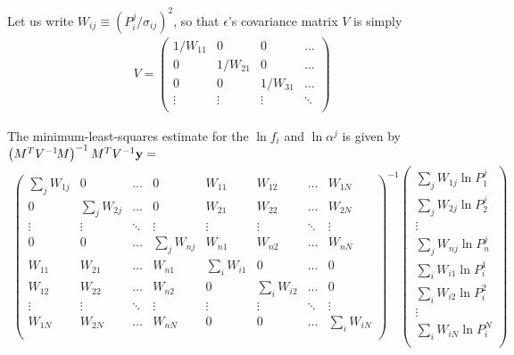 \documentclass[12pt]{article}
\begin{document}
Let us write $W_{ij} \equiv \left(P_i^j/\sigma_{ij}\right)^2$, so that
{\boldmath $\epsilon$}'s covariance matrix $V$ is simply
\begin{eqnarray*}
V = \left(\begin{array}{cccc}
	1/W_{11} & 0 & 0 & \ldots \\
	0 & 1/W_{21} & 0 & \ldots \\
	0 & 0 & 1/W_{31} & \ldots \\
	\vdots & \vdots & \vdots& \ddots \\
\end{array}\right)
\end{eqnarray*}

The minimum-least-squares estimate for the $\ln f_i$ and $\ln\alpha^j$
is given by $\left(M^T V^{-1}\! M\right)^{-1} M^T V^{-1} {\bf y} = $
\begin{eqnarray*}
\left(\begin{array}{cccc|ccccc}
	\sum_j W_{1j} & 0 & \ldots & 0 &
			W_{11} & W_{12} & \ldots & W_{1N} \\
	0 & \sum_j W_{2j} & \ldots & 0 &
			W_{21} & W_{22} & \ldots & W_{2N} \\
	\vdots &\vdots& \ddots  & \vdots  & \vdots & \vdots & \ddots & \vdots\\
	0 & 0 & \ldots & \sum_j W_{nj} &
			W_{n1} & W_{n2} & \ldots & W_{nN} \\
\hline
	W_{11} & W_{21} & \ldots & W_{n1} &
			\sum_i W_{i1} & 0 & \ldots & 0 \\
	W_{12} & W_{22} & \ldots & W_{n2} &
			0 & \sum_i W_{i2} & \ldots & 0 \\
	\vdots &\vdots& \ddots  & \vdots  & \vdots & \vdots &\ddots & \vdots\\
	W_{1N} & W_{2N} & \ldots & W_{nN} &
			0 & 0 & \ldots & \sum_i W_{iN} \\
\end{array}\right)^{-1}
\left(\begin{array}{c}
\sum_j W_{1j} \ln P_1^j \\
\sum_j W_{2j} \ln P_2^j \\
\vdots \\
\sum_j W_{nj} \ln P_n^j \\
\hline
\sum_i W_{i1} \ln P_i^1 \\
\sum_i W_{i2} \ln P_i^2 \\
\vdots \\
\sum_i W_{iN} \ln P_i^N \\
\end{array}\right)
\end{eqnarray*}
\end{document}
